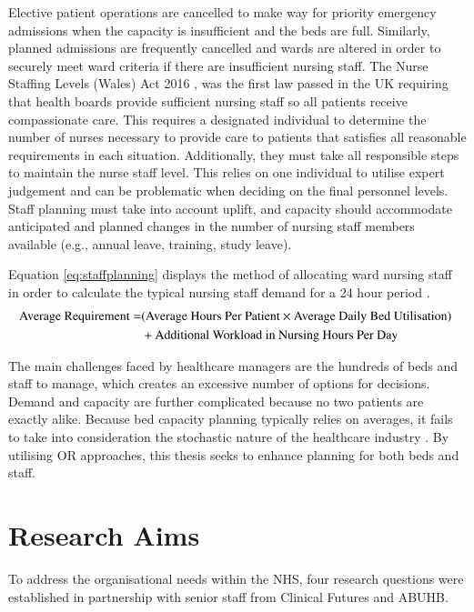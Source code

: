 \documentclass[../thesis.tex]{subfiles}
\begin{document}
Elective patient operations are cancelled to make way for priority emergency admissions when the capacity is insufficient and the beds are full. Similarly, planned admissions are frequently cancelled and wards are altered in order to securely meet ward criteria if there are insufficient nursing staff. The Nurse Staffing Levels (Wales) Act 2016 \cite{NHSAct2006}, was the first law passed in the UK requiring that health boards provide sufficient nursing staff so all patients receive compassionate care. This requires a designated individual to determine the number of nurses necessary to provide care to patients that satisfies all reasonable requirements in each situation. Additionally, they must take all responsible steps to maintain the nurse staff level. This relies on one individual to utilise expert judgement and can be problematic when deciding on the final personnel levels. Staff planning must take into account uplift, and capacity should accommodate anticipated and planned changes in the number of nursing staff members available (e.g., annual leave, training, study leave).

Equation \ref{eq:staffplanning} displays the method of allocating ward nursing staff in order to calculate the typical nursing staff demand for a 24 hour period \cite{NIHCE2014}. 
{\small
\begin{align}\label{eq:staffplanning}
    \text{Average Requirement} =& (\text{Average Hours Per Patient} \times \text{Average Daily Bed Utilisation) } \notag \\ & + \text{Additional Workload in Nursing Hours Per Day}
\end{align}
}

The main challenges faced by healthcare managers are the hundreds of beds and staff to manage, which creates an excessive number of options for decisions. Demand and capacity are further complicated because no two patients are exactly alike. Because bed capacity planning typically relies on averages, it fails to take into consideration the stochastic nature of the healthcare industry \cite{Harper2002}. By utilising OR approaches, this thesis seeks to enhance planning for both beds and staff.



\section{Research Aims}\label{sec:researchaims}
To address the organisational needs within the NHS, four research questions were established in partnership with senior staff from Clinical Futures and ABUHB.
\end{document}
